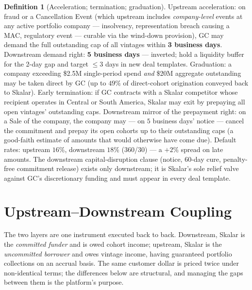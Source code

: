 \documentclass[11pt, a4paper]{article}
\theoremstyle{definition}
\newtheorem{definition}{Definition}[section]
\newcommand{\src}[1]{}
\newcommand{\GCCIA}{upstream facility}
\newcommand{\KCIA}{downstream agreement}
\begin{document}
\begin{definition}[Acceleration; termination; graduation]\label{def:accel}
Upstream acceleration: on fraud or a Cancellation Event (which upstream includes \emph{company-level} events at any active portfolio company --- insolvency, representation breach causing a MAC, regulatory event --- curable via the wind-down provision), GC may demand the full outstanding cap of all vintages within \textbf{3 business days}. Downstream demand right: \textbf{5 business days} --- inverted; hold a liquidity buffer for the 2-day gap and target $\leq 3$ days in new deal templates. Graduation: a company exceeding \$2.5M single-period spend \emph{and} \$20M aggregate outstanding may be taken direct by GC (up to $49\%$ of direct-cohort origination conveyed back to Skalar). Early termination: if GC contracts with a Skalar competitor whose recipient operates in Central or South America, Skalar may exit by prepaying all open vintages' outstanding caps. Downstream mirror of the prepayment right: on a Sale of the company, the company may --- on $5$ business days' notice --- cancel the commitment and prepay its open cohorts up to their outstanding caps (a good-faith estimate of amounts that would otherwise have come due). Default rates: upstream $16\%$, downstream $18\%$ (360/30) --- a $+2\%$ spread on late amounts. The downstream capital-disruption clause (notice, 60-day cure, penalty-free commitment release) exists only downstream; it is Skalar's sole relief valve against GC's discretionary funding and must appear in every deal template.
\src{\GCCIA{} \S1.1 (``Cancellation Event''), \S2.2(d), Sch.~A \S2.1--2.2; \KCIA{} \S2.2(c), Sch.~A \S2.4.}
\end{definition}

\section{Upstream--Downstream Coupling}\label{sec:coupling}

The two layers are one instrument executed back to back. Downstream, Skalar is the \emph{committed funder} and is owed cohort income; upstream, Skalar is the \emph{uncommitted borrower} and owes vintage income, having guaranteed portfolio collections on an accrual basis. The same customer dollar is priced twice under non-identical terms; the differences below are structural, and managing the gaps between them is the platform's purpose.
\end{document}
